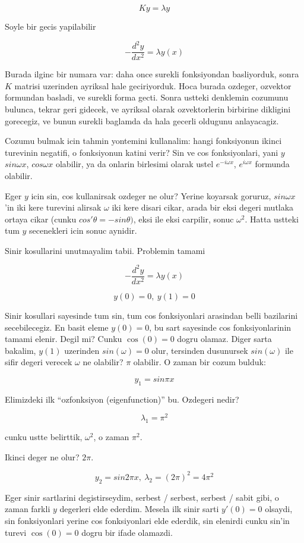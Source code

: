\documentclass[12pt,fleqn]{article}\usepackage{../common}
\begin{document}
\[ Ky = \lambda y \]

Soyle bir gecis yapilabilir

\[ -\frac{d^2y}{dx^2} = \lambda y(x) \]

Burada ilginc bir numara var: daha once surekli fonksiyondan basliyorduk,
sonra $K$ matrisi uzerinden ayriksal hale geciriyorduk. Hoca burada
ozdeger, ozvektor formundan basladi, ve surekli forma gecti. Sonra ustteki
denklemin cozumunu bulunca, tekrar geri gidecek, ve ayriksal olarak
ozvektorlerin birbirine dikligini gorecegiz, ve bunun surekli baglamda da
hala gecerli oldugunu anlayacagiz. 

Cozumu bulmak icin tahmin yontemini kullanalim: hangi fonksiyonun ikinci
turevinin negatifi, o fonksiyonun katini verir? Sin ve cos fonksiyonlari,
yani $y$ $sin \omega x$, $cos \omega x$ olabilir, ya da onlarin birlesimi
olarak ustel $e^{-i\omega x}$, $e^{i\omega x}$ formunda olabilir.

Eger $y$ icin sin, cos kullanirsak ozdeger ne olur? Yerine koyarsak
goruruz, $sin\omega x$'in iki kere turevini alirsak $\omega$ iki kere
disari cikar, arada bir eksi degeri mutlaka ortaya cikar (cunku 
$cos'\theta =
-sin\theta)$, eksi ile eksi carpilir, sonuc $\omega^2$. Hatta ustteki tum
$y$ secenekleri icin sonuc aynidir. 
 
Sinir kosullarini unutmayalim tabii. Problemin tamami

\[ -\frac{d^2y}{dx^2} = \lambda y(x) \]

\[ y(0) = 0, \ y(1) = 0 \]

Sinir kosullari sayesinde tum sin, tum cos fonksiyonlari arasindan belli
bazilarini secebilecegiz. En basit eleme $y(0) = 0$, bu sart sayesinde cos
fonksiyonlarinin tamami elenir. Degil mi? Cunku $\cos(0) = 0$ dogru
olamaz. Diger sarta bakalim, $y(1)$ uzerinden $sin(\omega) = 0$ olur,
tersinden dusunursek $sin(\omega)$ ile sifir degeri verecek $\omega$ ne
olabilir? $\pi$ olabilir. O zaman bir cozum bulduk:

\[ y_1 = sin \pi x \]

Elimizdeki ilk ``ozfonksiyon (eigenfunction)'' bu. Ozdegeri nedir?

\[ \lambda_1 = \pi^2 \]

cunku ustte belirttik, $\omega^2$, o zaman $\pi^2$. 

Ikinci deger ne olur? $2\pi$. 

\[ y_2 = sin2\pi x, \ \lambda_2 = (2\pi)^2 = 4\pi^2 \]

Eger sinir sartlarini degistirseydim, serbest / serbest, serbest / sabit
gibi, o zaman farkli $y$ degerleri elde ederdim. Mesela ilk sinir sarti
$y'(0) = 0$ olsaydi, sin fonksiyonlari yerine cos fonksiyonlari elde
ederdik, sin elenirdi cunku sin'in turevi $\cos(0) = 0$ dogru bir ifade
olamazdi. 
\end{document}
